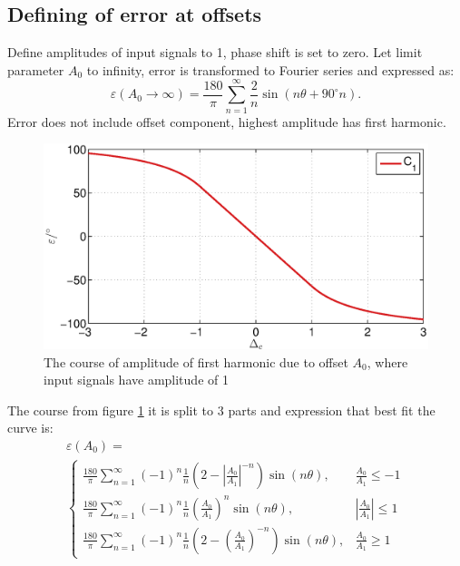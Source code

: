 \documentclass[a4paper]{article}
\begin{document}
\subsection{Defining of error at offsets}
Define amplitudes of input signals to 1, phase shift is set to zero. Let limit parameter $A_0$ to infinity, error is transformed to Fourier series and expressed as:
\begin{equation}
\label{equ:off_lim_vrsta}
\varepsilon (A_0 \rightarrow \infty) = \frac{180}{\pi}\sum_{n=1}^{\infty}\frac{2}{n} \sin (n \theta+ 90^\circ n).
\end{equation}
Error does not include offset component, highest amplitude has first harmonic.
\begin{figure}[!htb]
	\begin{center}
		\includegraphics[width=\linewidth]{./Slike/off.eps}
		\caption{The course of amplitude of first harmonic due to offset  $A_0$, where input signals have amplitude of 1 } \label{fig:off}
	\end{center}
\end{figure}
The course from figure \ref{fig:off} it is split to 3 parts and expression that best fit the curve is:
\begin{multline}
\label{equ:offc_err}
\varepsilon(A_0)=\\
\begin{cases}
\frac{180}{\pi}\sum_{n=1}^{\infty}(-1)^n\frac{1}{n}(2-|\frac{A_0}{A_1}|^{-n}) \sin (n \theta ), & \frac{A_0}{A_1}\leq -1 \\
\frac{180}{\pi}\sum_{n=1}^{\infty}(-1)^n\frac{1}{n}(\frac{A_0}{A_1})^n \sin (n \theta ), & |\frac{A_0}{A_1}|\leq 1 \\
\frac{180}{\pi}\sum_{n=1}^{\infty}(-1)^n\frac{1}{n}(2-(\frac{A_0}{A_1})^{-n}) \sin (n \theta ), & \frac{A_0}{A_1}\geq 1
\end{cases}
\end{multline}
\end{document}
